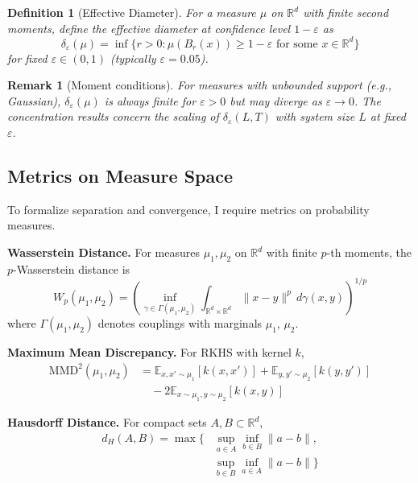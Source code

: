\documentclass[aps,pre,reprint,amsmath,amssymb,superscriptaddress]{revtex4-2}
\newtheorem{definition}{Definition}
\newtheorem{remark}{Remark}
\newcommand{\bbR}{\mathbb{R}}
\newcommand{\bbE}{\mathbb{E}}
\begin{document}
\begin{definition}[Effective Diameter]
\label{def:effective-diameter}
For a measure $\mu$ on $\bbR^d$ with finite second moments, define the effective diameter at confidence level $1-\varepsilon$ as
\begin{equation}
\delta_\varepsilon(\mu) = \inf\{r > 0 : \mu(B_r(x)) \geq 1-\varepsilon \text{ for some } x \in \bbR^d\}
\end{equation}
for fixed $\varepsilon \in (0,1)$ (typically $\varepsilon = 0.05$).
\end{definition}

\begin{remark}[Moment conditions]
For measures with unbounded support (e.g., Gaussian), $\delta_\varepsilon(\mu)$ is always finite for $\varepsilon > 0$ but may diverge as $\varepsilon \to 0$. The concentration results concern the scaling of $\delta_\varepsilon(L,T)$ with system size $L$ at fixed $\varepsilon$.
\end{remark}

\subsection{Metrics on Measure Space}

To formalize separation and convergence, I require metrics on probability measures.

\textbf{Wasserstein Distance.} For measures $\mu_1, \mu_2$ on $\bbR^d$ with finite $p$-th moments, the $p$-Wasserstein distance is
\begin{equation}
W_p(\mu_1, \mu_2) = \left(\inf_{\gamma \in \Gamma(\mu_1,\mu_2)} \int_{\bbR^d \times \bbR^d} \|x-y\|^p \, d\gamma(x,y)\right)^{1/p}
\end{equation}
where $\Gamma(\mu_1,\mu_2)$ denotes couplings with marginals $\mu_1$, $\mu_2$.

\textbf{Maximum Mean Discrepancy.} For RKHS with kernel $k$,
\begin{align}
\text{MMD}^2(\mu_1, \mu_2) &= \bbE_{x,x'\sim\mu_1}[k(x,x')] + \bbE_{y,y'\sim\mu_2}[k(y,y')] \nonumber\\
&\quad - 2\bbE_{x\sim\mu_1,y\sim\mu_2}[k(x,y)]
\end{align}

\textbf{Hausdorff Distance.} For compact sets $A, B \subset \bbR^d$,
\begin{align}
d_H(A,B) = \max\Big\{&\sup_{a\in A} \inf_{b\in B} \|a-b\|, \nonumber\\
&\sup_{b\in B} \inf_{a\in A} \|a-b\|\Big\}
\end{align}
\end{document}
